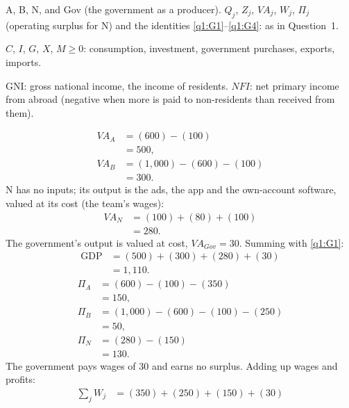 \begin{sol}
\begin{notacao}
\item A, B, N, and Gov (the government as a producer). $Q_j$, $Z_j$, $VA_j$, $W_j$, $\Pi_j$ (operating surplus for N) and
the identities \eqref{q1:G1}--\eqref{q1:G4}: as in Question~1.
\item $C$, $I$, $G$, $X$, $M\ge0$: consumption, investment, government purchases, exports, imports.
\item GNI: gross national income, the income of residents. $NFI$: net primary income from abroad (negative when more is paid
to non-residents than received from them).
\end{notacao}

\begin{align}
VA_A &= (600)-(100) \nonumber\\
&= 500, \label{q8:vaA}\\
VA_B &= (1{,}000)-(600)-(100) \nonumber\\
&= 300. \label{q8:vaB}
\end{align}
N has no inputs; its output is the ads, the app and the own-account software, valued at its cost (the team's wages):
\begin{align}
VA_N &= (100)+(80)+(100) \nonumber\\
&= 280. \label{q8:vaN}
\end{align}
The government's output is valued at cost, $VA_{Gov}=30$. Summing with \eqref{q1:G1}:
\begin{align*}
\text{GDP} &= (500)+(300)+(280)+(30)\\
&= 1{,}110 .
\end{align*}
\begin{align*}
\Pi_A &= (600)-(100)-(350)\\
&= 150,\\
\Pi_B &= (1{,}000)-(600)-(100)-(250)\\
&= 50,\\
\Pi_N &= (280)-(150)\\
&= 130.
\end{align*}
The government pays wages of 30 and earns no surplus. Adding up wages and profits:
\begin{align}
\textstyle\sum_j W_j &= (350)+(250)+(150)+(30) \nonumber\\

\end{align}
\end{sol}
